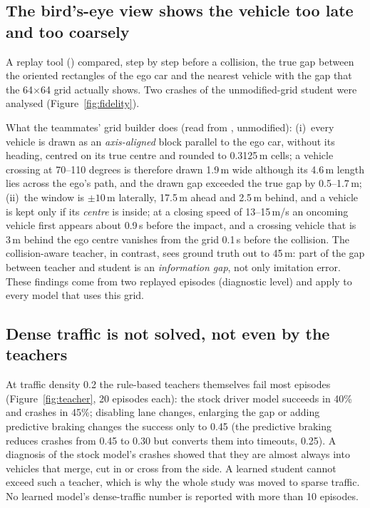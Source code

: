 \subsection{The bird's-eye view shows the vehicle too late and too coarsely}
A replay tool () compared, step by step before a collision, the true gap between the oriented rectangles of the ego car and the nearest vehicle with the gap that the 64$\times$64 grid actually shows. Two crashes of the unmodified-grid student were analysed (Figure~\ref{fig:fidelity}).

What the teammates' grid builder does (read from , unmodified): (i)~every vehicle is drawn as an \emph{axis-aligned} block parallel to the ego car, without its heading, centred on its true centre and rounded to 0.3125\,m cells; a vehicle crossing at 70--110 degrees is therefore drawn 1.9\,m wide although its 4.6\,m length lies across the ego's path, and the drawn gap exceeded the true gap by 0.5--1.7\,m;
(ii)~the window is $\pm10$\,m laterally, 17.5\,m ahead and 2.5\,m behind, and a vehicle is kept only if its \emph{centre} is inside; at a closing speed of 13--15\,m/s an oncoming vehicle first appears about 0.9\,s before the impact, and a crossing vehicle that is 3\,m behind the ego centre vanishes from the grid 0.1\,s before the collision.
The collision-aware teacher, in contrast, sees ground truth out to 45\,m: part of the gap between teacher and student is an \emph{information gap}, not only imitation error. These findings come from two replayed episodes (diagnostic level) and apply to every model that uses this grid.

\subsection{Dense traffic is not solved, not even by the teachers}
At traffic density 0.2 the rule-based teachers themselves fail most episodes (Figure~\ref{fig:teacher}, 20 episodes each): the stock driver model succeeds in 40\% and crashes in 45\%; disabling lane changes, enlarging the gap or adding predictive braking changes the success only to 0.45 (the predictive braking reduces crashes from 0.45 to 0.30 but converts them into timeouts, 0.25).
A diagnosis of the stock model's crashes showed that they are almost always into vehicles that merge, cut in or cross from the side. A learned student cannot exceed such a teacher, which is why the whole study was moved to sparse traffic. No learned model's dense-traffic number is reported with more than 10 episodes.


